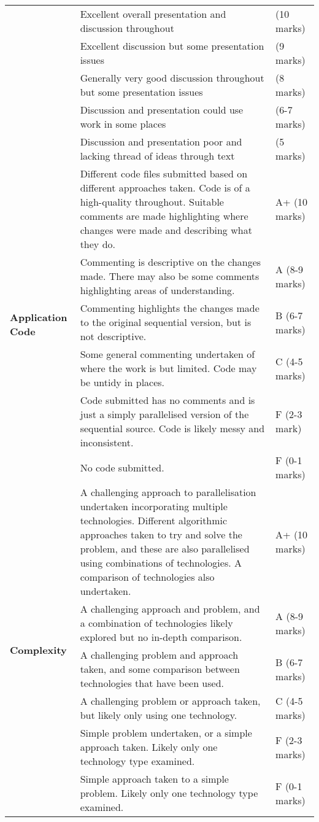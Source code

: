 \documentclass[a4paper, 12pt]{article}
\begin{document}
\begin{table}[H]
\begin{tabularx}{\textwidth}{|l|X|l|}
		\cline{2-3}
		& Excellent overall presentation and discussion throughout & (10 marks) \\
		\cline{2-3}
		& Excellent discussion but some presentation issues & (9 marks) \\
		\cline{2-3}
		& Generally very good discussion throughout but some presentation issues & (8 marks) \\
		\cline{2-3}
		& Discussion and presentation could use work in some places & (6-7 marks) \\
		\cline{2-3}
		& Discussion and presentation poor and lacking thread of ideas through text & (5 marks) \\
		\hline
		\multirow{6}{*}{\textbf{Application	Code}} &	Different code files submitted based on different approaches taken. Code is	of a high-quality throughout. Suitable comments are made highlighting where changes were made and describing what they do. & A+ (10 marks) \\
		\cline{2-3}
		& Commenting is descriptive on the changes made. There may also be some comments highlighting areas of understanding. & A (8-9 marks) \\
		\cline{2-3}
		& Commenting highlights the changes made to the original sequential version, but is not descriptive. & B (6-7 marks) \\
		\cline{2-3}
		& Some general commenting undertaken of where the work is but limited. Code may be untidy in places. & C (4-5 marks) \\
		\cline{2-3}
		& Code submitted has no comments and is just a simply parallelised version of the sequential source. Code is likely messy and inconsistent. & F (2-3 mark) \\
		\cline{2-3}
		& No code submitted. & F (0-1 marks) \\
		\hline
		\multirow{6}{*}{\textbf{Complexity}} & A challenging approach to parallelisation undertaken incorporating multiple technologies. Different algorithmic approaches taken to try and solve the	problem, and these are also parallelised using combinations of technologies. A comparison of technologies also undertaken. & A+ (10 marks) \\
		\cline{2-3}
		& A challenging approach and problem, and a combination of technologies likely explored but no in-depth comparison. & A (8-9 marks) \\
		\cline{2-3}
		& A challenging problem and approach taken, and some comparison between technologies that have been used. & B (6-7 marks) \\
		\cline{2-3}
		& A challenging problem or approach taken, but likely only using one technology. & C (4-5 marks) \\
		\cline{2-3}
		& Simple problem undertaken, or a simple approach taken. Likely only one technology type examined. & F (2-3 marks) \\
		\cline{2-3}
		& Simple approach taken to a simple problem. Likely only one technology type examined. & F (0-1 marks) \\
		\hline
	\end{tabularx}
\end{table}
\end{document}
